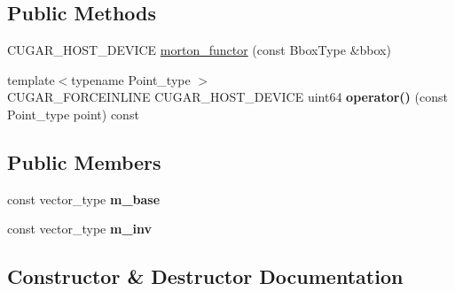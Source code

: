 \subsection*{Public Methods}
\begin{DoxyCompactItemize}
\item 
C\+U\+G\+A\+R\+\_\+\+H\+O\+S\+T\+\_\+\+D\+E\+V\+I\+CE \hyperlink{structcugar_1_1morton__functor_3_01uint64_00_013u_00_01_bbox_type_01_4_a6ace06e9bfdebc5de7bf0fbb1fcb6bc9}{morton\+\_\+functor} (const Bbox\+Type \&bbox)
\item 
\mbox{\label{structcugar_1_1morton__functor_3_01uint64_00_013u_00_01_bbox_type_01_4_a7a4f41f326b07855215302f216977727}} 
{\footnotesize template$<$typename Point\+\_\+type $>$ }\\C\+U\+G\+A\+R\+\_\+\+F\+O\+R\+C\+E\+I\+N\+L\+I\+NE C\+U\+G\+A\+R\+\_\+\+H\+O\+S\+T\+\_\+\+D\+E\+V\+I\+CE uint64 {\bfseries operator()} (const Point\+\_\+type point) const
\end{DoxyCompactItemize}
\subsection*{Public Members}
\begin{DoxyCompactItemize}
\item 
\mbox{\label{structcugar_1_1morton__functor_3_01uint64_00_013u_00_01_bbox_type_01_4_afb2ae8702573e2186c8326b941634da0}} 
const vector\+\_\+type {\bfseries m\+\_\+base}
\item 
\mbox{\label{structcugar_1_1morton__functor_3_01uint64_00_013u_00_01_bbox_type_01_4_a48a296f6f0be2651b58e2cbb9000a5a5}} 
const vector\+\_\+type {\bfseries m\+\_\+inv}
\end{DoxyCompactItemize}


\subsection{Constructor \& Destructor Documentation}
\mbox{\label{structcugar_1_1morton__functor_3_01uint64_00_013u_00_01_bbox_type_01_4_a6ace06e9bfdebc5de7bf0fbb1fcb6bc9}} 

